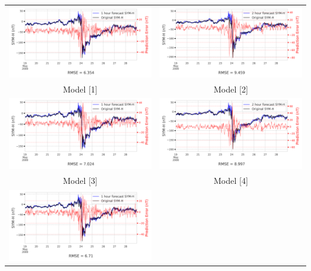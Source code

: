 \documentclass[draft,sw]{agutexSI2019}
\begin{document}
\begin{table}
\centering
\begin{tabular}{cc}
\includegraphics[width=0.49\linewidth]{paper_plots/1h_swics/1h_swics_storm_32.png}
&
\includegraphics[width=0.49\linewidth]{paper_plots/2h_swics/2h_swics_storm_32.png}
\\
Model [1] & Model [2]
\vspace*{12pt}
\\
\includegraphics[width=0.49\linewidth]{paper_plots/1h_no_swics/1h_no_swics_storm_32.png}
&
\includegraphics[width=0.49\linewidth]{paper_plots/2h_no_swics/2h_no_swics_storm_32.png}
\\
Model [3] & Model [4]
\vspace*{12pt}
\\
\includegraphics[width=0.49\linewidth]{paper_plots/1h_swics_model_on_no_swics/1h_swics_model_on_no_swics_storm_32.png}

\end{tabular}
\end{table}
\end{document}
